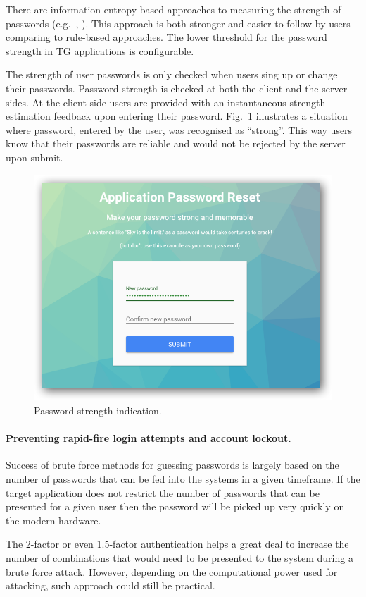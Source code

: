 \documentclass[a4paper,12pt,oneside,openright]{memoir}
\begin{document}
	There are information entropy based approaches to measuring the strength of passwords (e.g.~\cite{NIST}, \cite{DROPBOX}).
	This approach is both stronger and easier to follow by users comparing to rule-based approaches.
	The lower threshold for the password strength in TG applications is configurable.
	
	The strength of user passwords is only checked when users sing up or change their passwords.
	Password strength is checked at both the client and the server sides.
	At the client side users are provided with an instantaneous strength estimation feedback upon entering their password.
	\hyperref[sec:02:fig:1]{Fig.~\ref*{sec:02:fig:1}} illustrates a situation where password, entered by the user, was recognised as ``strong''.
	This way users know that their passwords are reliable and would not be rejected by the server upon submit.

	\begin{figure}[h!tbp]
	\centering
	\includegraphics[width=0.6\linewidth]{images/03-new-user-setting-up-password.png}
	\caption{Password strength indication.}\label{sec:02:fig:1}
	\end{figure}

\paragraph*{Preventing rapid-fire login attempts and account lockout.}

	Success of brute force methods for guessing passwords is largely based on the number of passwords that can be fed into the systems in a given timeframe.
	If the target application does not restrict the number of passwords that can be presented for a given user then the password will be picked up very quickly on the modern hardware.

	The 2-factor or even 1.5-factor authentication helps a great deal to increase the number of combinations that would need to be presented to the system during a brute force attack.
	However, depending on the computational power used for attacking, such approach could still be practical.
\end{document}
